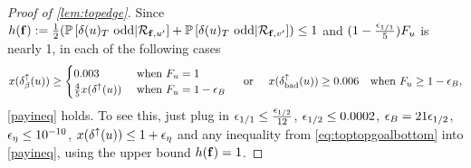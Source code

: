 \begin{proof}[Proof of \cref{lem:topedge}]
Since  $h({\bf f}):= \frac{1}{2}  ({\mathbb{P}}\left[\delta(u)_T\text{ odd}|{\mathcal{R}}_{{\bf f},u'}\right] + {\mathbb{P}}\left[\delta(u)_T\text{ odd} | {\mathcal{R}}_{{\bf f},v'}\right])\le 1$
 and  $(1-\frac{{\epsilon}_{1/1}}{5})F_u$ is nearly 1, in each of the following cases
\begin{equation}\label{eq:toptopgoalbottom}
	x(\delta^\uparrow_\beta(u)) \ge \begin{cases}
 	0.003 & \text{ when $F_u = 1$}\\
 	\frac{4}{5} x(\delta^\uparrow(u)) & \text{ when $F_u = 1- {\epsilon}_B$}
 \end{cases}\quad \text{ or }\quad x(\delta^\uparrow_\text{bad}(u)) \ge 0.006 \quad\text{when $F_u \ge 1- {\epsilon}_B$},
\end{equation}
\eqref{payineq} holds. To see this, just plug in ${\epsilon}_{1/1} \leq \frac{{\epsilon}_{1/2}}{12}$,  ${\epsilon}_{1/2}\leq 0.0002$,   ${\epsilon}_B = 21{\epsilon}_{1/2}$,  ${\epsilon}_\eta \leq 10 ^{-10}$,  $x(\delta^\uparrow(u))\le 1 + {\epsilon}_\eta$ and any inequality from \eqref{eq:toptopgoalbottom} into \eqref{payineq}, using the upper bound $h({\bf f}) = 1$.





\end{proof}
